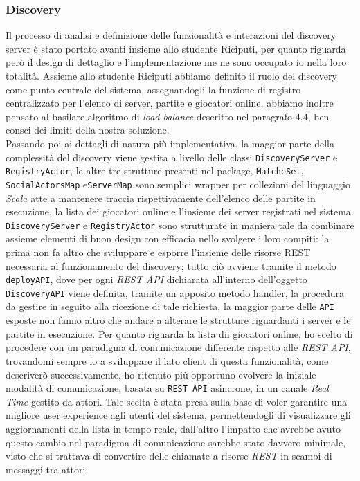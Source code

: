 \subsubsection{\textbf{Discovery}}
Il processo di analisi e definizione delle funzionalità e interazioni del discovery server è stato portato avanti insieme allo studente Riciputi, per quanto riguarda però il design di dettaglio e l'implementazione me ne sono occupato io nella loro totalità.
Assieme allo studente Riciputi abbiamo definito il ruolo del discovery come punto centrale del sistema, assegnandogli la funzione di registro centralizzato per l'elenco di server, partite e giocatori online, abbiamo inoltre pensato al basilare algoritmo di \textit{load balance} descritto nel paragrafo 4.4, ben consci dei limiti della nostra soluzione.\\
Passando poi ai dettagli di natura più implementativa, la maggior parte della complessità del discovery viene gestita a livello delle classi \texttt{DiscoveryServer} e \texttt{RegistryActor}, le altre tre strutture presenti nel package, \texttt{MatcheSet}, \texttt{SocialActorsMap} e\texttt{ServerMap} sono semplici wrapper per collezioni del linguaggio \textit{Scala} atte a mantenere traccia rispettivamente dell'elenco delle partite in esecuzione, la lista dei giocatori online e l'insieme dei server registrati nel sistema.
\texttt{DiscoveryServer} e \texttt{RegistryActor} sono strutturate in maniera tale da combinare assieme elementi di buon design con efficacia nello svolgere i loro compiti: la prima non fa altro che sviluppare e esporre l'insieme delle risorse REST necessaria al funzionamento del discovery; tutto ciò avviene tramite il metodo \texttt{deployAPI}, dove per ogni \textit{REST API} dichiarata all'interno dell'oggetto \texttt{DiscoveryAPI} viene definita, tramite un apposito metodo handler, la procedura da gestire in seguito alla ricezione di tale richiesta, la maggior parte delle \texttt{API} esposte non fanno altro che andare a alterare le strutture riguardanti i server e le partite in esecuzione.
Per quanto riguarda la lista dii giocatori online, ho scelto di procedere con un paradigma di comunicazione differente rispetto alle \textit{REST API}, trovandomi sempre io a sviluppare il lato client di questa funzionalità, come descriverò successivamente, ho ritenuto più opportuno evolvere la iniziale modalità di comunicazione, basata su \texttt{REST API} asincrone, in un canale \textit{Real Time} gestito da attori. Tale scelta è stata presa sulla base di voler garantire una migliore user experience agli utenti del sistema, permettendogli di visualizzare gli aggiornamenti della lista in tempo reale, dall'altro l'impatto che avrebbe avuto questo cambio nel paradigma di comunicazione sarebbe stato davvero minimale, visto che si trattava di convertire delle chiamate a risorse \textit{REST} in scambi di messaggi tra attori.\\

